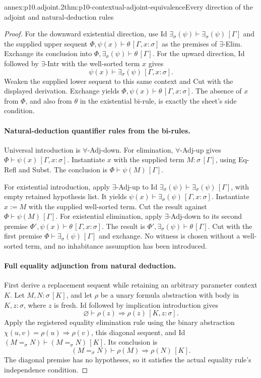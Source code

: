 \begin{annexitem}{annex:p10.adjoint.2}{thm:p10-contextual-adjoint-equivalence}{Every direction of the adjoint and natural-deduction rules}
\begin{proof}
For the downward existential direction, use Id
\(\exists_\sigma(\psi)\vdash\exists_\sigma(\psi)\,[\Gamma]\)
and the supplied upper sequent
\(\Phi,\psi(x)\vdash\theta\,[\Gamma,x:\sigma]\)
as the premises of \(\exists\)-Elim. Exchange its conclusion
into \(\Phi,\exists_\sigma(\psi)\vdash\theta\,[\Gamma]\).
For the upward direction, Id followed by \(\exists\)-Intr
with the well-sorted term \(x\) gives
\[
 \psi(x)\vdash\exists_\sigma(\psi)\,[\Gamma,x:\sigma].
\]
Weaken the supplied lower sequent to this same context and Cut
with the displayed derivation. Exchange yields
\(\Phi,\psi(x)\vdash\theta\,[\Gamma,x:\sigma]\).
The absence of \(x\) from \(\Phi\), and also from \(\theta\)
in the existential bi-rule, is exactly the sheet's side condition.

\paragraph{Natural-deduction quantifier rules from the bi-rules.}
Universal introduction is \(\forall\)-Adj-down.
For elimination, \(\forall\)-Adj-up gives
\(\Phi\vdash\psi(x)\,[\Gamma,x:\sigma]\).
Instantiate \(x\) with the supplied term
\(M:\sigma\,[\Gamma]\), using Eq-Refl and Subst.
The conclusion is \(\Phi\vdash\psi(M)\,[\Gamma]\).

For existential introduction, apply \(\exists\)-Adj-up to Id
\(\exists_\sigma(\psi)\vdash\exists_\sigma(\psi)\,[\Gamma]\),
with empty retained hypothesis list. It yields
\(\psi(x)\vdash\exists_\sigma(\psi)\,[\Gamma,x:\sigma]\).
Instantiate \(x:=M\) with the supplied well-sorted term.
Cut the result against \(\Phi\vdash\psi(M)\,[\Gamma]\).
For existential elimination, apply \(\exists\)-Adj-down to its
second premise \(\Phi',\psi(x)\vdash\theta\,[\Gamma,x:\sigma]\).
The result is \(\Phi',\exists_\sigma(\psi)\vdash\theta\,[\Gamma]\).
Cut with the first premise \(\Phi\vdash\exists_\sigma(\psi)\,[\Gamma]\)
and exchange. No witness is chosen without a well-sorted term,
and no inhabitance assumption has been introduced.

\paragraph{Full equality adjunction from natural deduction.}
First derive a replacement sequent while retaining an arbitrary
parameter context \(K\).
Let \(M,N:\sigma\,[K]\), and let \(\rho\) be a unary formula
abstraction with body in \(K,z:\sigma\), where \(z\) is fresh.
Id followed by implication introduction gives
\[
       \varnothing\vdash\rho(z)\Rightarrow\rho(z)\,[K,z:\sigma].
\]
Apply the registered equality elimination rule using the binary
abstraction \(\chi(u,v)=\rho(u)\Rightarrow\rho(v)\), this
diagonal sequent, and Id
\((M=_\sigma N)\vdash(M=_\sigma N)\,[K]\).
Its conclusion is
\[
          (M=_\sigma N)\vdash\rho(M)\Rightarrow\rho(N)\,[K].
\]
The diagonal premise has no hypotheses, so it satisfies the
actual equality rule's independence condition.


\end{proof}
\end{annexitem}

